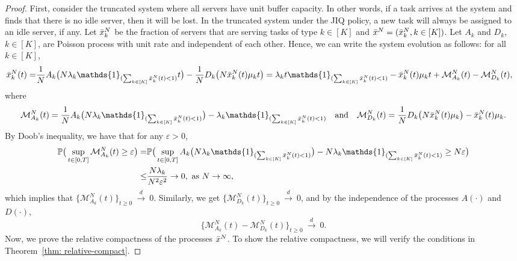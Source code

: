 \documentclass[11pt, reqno]{article}
\numberwithin{equation}{section}
\numberwithin{theorem}{section}
\newcommand{\dto}{\ensuremath{\ \xrightarrow{d} \ }}  %
\newcommand{\PP}{\mathbb{P}}  				%
\begin{document}
\begin{proof}
First, consider the truncated system where all servers have unit buffer capacity. 
In other words, if a task arrives at the system and finds that there is no idle server, then it will be lost. In the truncated system under the JIQ policy, a new task will always be assigned to an idle server, if any. Let $\Bar{x}^N_k$ be the fraction of servers that are serving tasks of type $k\in[K]$ and $\Bar{x}^N=(\Bar{x}^N_k,k\in[K])$. Let $A_k$ and $D_k$, $k\in[K]$, are Poisson process with unit rate and independent of each other. 
Hence, we can write the system evolution as follows: for all $k\in[K]$,
\begin{equation}\label{eq:xN-martingale}
    \begin{split}
        \Bar{x}^N_k(t)=&\frac{1}{N}A_k\big(N\lambda_k\mathds{1}_{(\sum_{k\in[K]}\Bar{x}^N_k(t)<1)}t\big)-\frac{1}{N}D_k\big(N \Bar{x}^N_k(t) \mu_k t\big)
        = \lambda_k t \mathds{1}_{(\sum_{k\in[K]}\Bar{x}^N_k(t)<1)}- \Bar{x}^N_k(t) \mu_k t + \mathcal{M}^N_{A_k}(t)-\mathcal{M}^N_{D_k}(t),
    \end{split}
\end{equation}
where $$\mathcal{M}^N_{A_k}(t)=\frac{1}{N}A_k\big(N\lambda_k\mathds{1}_{(\sum_{k\in[K]}\Bar{x}^N_k(t)<1)}\big)-\lambda_k\mathds{1}_{(\sum_{k\in[K]}\Bar{x}^N_k(t)<1)}\quad \text{and}\quad \mathcal{M}^N_{D_k}(t)=\frac{1}{N}D_k\big(N \Bar{x}^N_k(t) \mu_k\big)- \Bar{x}^N_k(t) \mu_k. $$
By Doob's inequality, we have that for any $\varepsilon>0$,
\begin{equation}
    \begin{split}
        \PP\big(\sup_{t\in[0,T]}\mathcal{M}^N_{A_k}(t)\geq \varepsilon  \big)
        =&\PP\big(\sup_{t\in[0,T]}A_k\big(N\lambda_k\mathds{1}_{(\sum_{k\in[K]}\Bar{x}^N_k(t)<1)}\big) - N \lambda_k\mathds{1}_{(\sum_{k\in[K]}\Bar{x}^N_k(t)<1)} \geq N\varepsilon  \big)\\
        \leq &\frac{N\lambda_k}{N^2\varepsilon^2}\rightarrow 0,\text{ as }N\rightarrow\infty,
    \end{split}
\end{equation}
which implies that $\{\mathcal{M}^N_{A_k}(t)\}_{t\geq 0}\dto0$. Similarly, we get $\{\mathcal{M}^N_{D_k}(t)\}_{t\geq 0}\dto0$, and by the independence of the processes $A(\cdot)$ and $D(\cdot)$, 
\begin{equation}\label{eq:martingale-conv}
    \Big\{\mathcal{M}^N_{A_k}(t)-\mathcal{M}^N_{D_k}(t)\Big\}_{t\geq 0}\dto0.
\end{equation}
Now, we prove the relative compactness of the processes $\Bar{x}^N$. To show the relative compactness, we will verify the conditions in Theorem~\ref{thm: relative-compact}. 

\end{proof}
\end{document}
